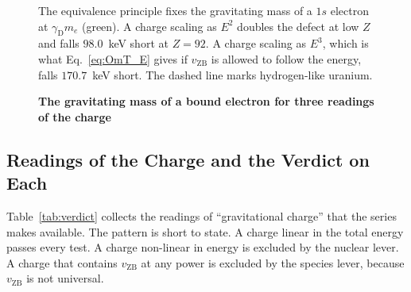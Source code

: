 \documentclass[%
 reprint, amsmath,amssymb, aps, prb, ]{revtex4-2}
\numberwithin{equation}{section}
\newcommand{\vZB}{v_{\text{ZB}}}
\newcommand{\gammaD}{\gamma_{\text{D}}}
\begin{document}
\begin{figure}[t!]
\centering
{}
\caption{\textbf{The gravitating mass of a bound electron for three readings of the charge}}
\label{fig:fork}
\vspace{0.4em}
\begin{minipage}{0.95\columnwidth}
\justifying\small
The equivalence principle fixes the gravitating mass of a $1s$ electron at $\gammaD m_e$ (green). A charge scaling as $E^{2}$ doubles the defect at low $Z$ and falls $98.0$~keV short at $Z = 92$. A charge scaling as $E^{3}$, which is what Eq.~\eqref{eq:OmT_E} gives if $\vZB$ is allowed to follow the energy, falls $170.7$~keV short. The dashed line marks hydrogen-like uranium.
\end{minipage}
\end{figure}

\subsection{Readings of the Charge and the Verdict on Each}
\label{subsec:candidates}

Table~\ref{tab:verdict} collects the readings of ``gravitational charge'' that the series makes available. The pattern is short to state. A charge linear in the total energy passes every test. A charge non-linear in energy is excluded by the nuclear lever. A charge that contains $\vZB$ at any power is excluded by the species lever, because $\vZB$ is not universal.
\end{document}
